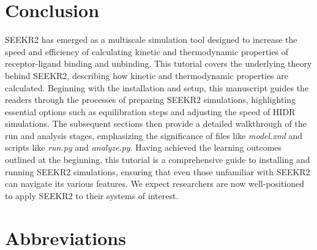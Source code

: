 \documentclass[9pt,training,pubversion]{livecoms}
\begin{document}
\section{Conclusion}
\vspace{2mm}

SEEKR2 has emerged as a multiscale simulation tool designed to increase the speed and efficiency of calculating kinetic and thermodynamic properties of receptor-ligand binding and unbinding. This tutorial covers the underlying theory behind SEEKR2, describing how kinetic and thermodynamic properties are calculated. Beginning with the installation and setup, this manuscript guides the readers through the processes of preparing SEEKR2 simulations, highlighting essential options such as equilibration steps and adjusting the speed of HIDR simulations. The subsequent sections then provide a detailed walkthrough of the run and analysis stages, emphasizing the significance of files like \textit{model.xml} and scripts like \textit{run.py} and \textit{analyze.py}. Having achieved the learning outcomes outlined at the beginning, this tutorial is a comprehensive guide to installing and running SEEKR2 simulations, ensuring that even those unfamiliar with SEEKR2 can navigate its various features. We expect researchers are now well-positioned to apply SEEKR2 to their systems of interest.

\section*{Abbreviations}
\vspace{2mm}
\end{document}
